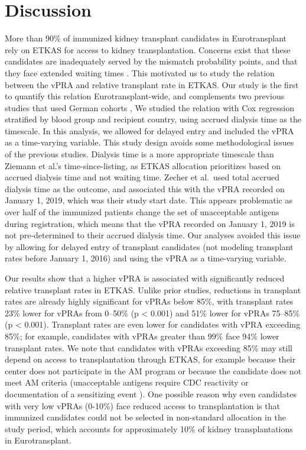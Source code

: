 \documentclass[11pt,twoside,]{book}
\begin{document}
\FloatBarrier

\section{Discussion}\label{discussion-2}

More than 90\% of immunized kidney transplant candidates in Eurotransplant
rely on ETKAS for access to kidney transplantation. Concerns exist that these candidates
are inadequately served by the mismatch probability points, and that they face extended
waiting times \citep{susal2015, ziemannUnacceptableHumanLeucocyte2017, zecherImpactSensitizationWaiting2022a}.
This motivated us to study the relation between the vPRA and relative
transplant rate in ETKAS. Our study is the first to quantify this relation
Eurotransplant-wide, and complements two previous studies that used German
cohorts \citep{ziemannUnacceptableHumanLeucocyte2017, zecherImpactSensitizationWaiting2022a},
\newpage
We studied the relation with Cox regression stratified by blood group
and recipient country, using accrued dialysis time as the timescale.
In this analysis, we allowed for delayed entry and included the vPRA as a
time-varying variable. This study design avoids some methodological issues of the
previous studies. Dialysis time is a more appropriate timescale than
Ziemann et al.'s time-since-listing, as ETKAS allocation prioritizes
based on accrued dialysis time and not waiting time. Zecher et al.~used
total accrued dialysis time as the outcome, and associated this with the vPRA recorded
on January 1, 2019, which was their study start date. This appears problematic as over half of the
immunized patients change the set of unacceptable antigens during
registration, which means that the vPRA recorded on January 1, 2019 is not
pre-determined to their accrued dialysis time. Our analyses avoided this issue
by allowing for delayed entry of transplant candidates (not modeling
transplant rates before January 1, 2016) and using the vPRA as a time-varying
variable.

Our results show that a higher vPRA is associated with significantly reduced
relative transplant rates in ETKAS. Unlike prior studies, reductions in
transplant rates are already highly significant for vPRAs below
85\%, with transplant rates 23\% lower for vPRAs from 0--50\%
(p \textless{} 0.001) and 51\% lower for vPRAs 75--85\% (p \textless{} 0.001). Transplant rates
are even lower for candidates with vPRA exceeding 85\%; for example, candidates with
vPRAs greater than 99\% face 94\% lower transplant rates. We note that candidates with
vPRAs exceeding 85\% may still depend on access to transplantation through ETKAS, for
example because their center does not participate in the AM program or because
the candidate does not meet AM criteria (unacceptable antigens require
CDC reactivity or documentation of a sensitizing event \citep{Heidt2021}).
One possible reason why even candidates with very low vPRAs (0-10\%) face
reduced access to transplantation is that immunized candidates
could not be selected in non-standard allocation in the study period, which
accounts for approximately 10\% of kidney transplantations in Eurotransplant.
\end{document}
